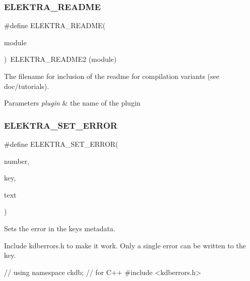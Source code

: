\subsubsection{\texorpdfstring{E\+L\+E\+K\+T\+R\+A\+\_\+\+R\+E\+A\+D\+ME}{ELEKTRA\_README}}
{\footnotesize\ttfamily \#define E\+L\+E\+K\+T\+R\+A\+\_\+\+R\+E\+A\+D\+ME(\begin{DoxyParamCaption}\item[{}]{module }\end{DoxyParamCaption})~E\+L\+E\+K\+T\+R\+A\+\_\+\+R\+E\+A\+D\+M\+E2 (module)}



The filename for inclusion of the readme for compilation variants (see doc/tutorials). 


\begin{DoxyParams}{Parameters}
{\em plugin} & the name of the plugin \\
\hline
\end{DoxyParams}
\mbox{\label{group__plugin_gaab1842b82272e6d4235b6a71587a64d9}} 
\subsubsection{\texorpdfstring{E\+L\+E\+K\+T\+R\+A\+\_\+\+S\+E\+T\+\_\+\+E\+R\+R\+OR}{ELEKTRA\_SET\_ERROR}}
{\footnotesize\ttfamily \#define E\+L\+E\+K\+T\+R\+A\+\_\+\+S\+E\+T\+\_\+\+E\+R\+R\+OR(\begin{DoxyParamCaption}\item[{}]{number,  }\item[{}]{key,  }\item[{}]{text }\end{DoxyParamCaption})}



Sets the error in the keys metadata. 

Include kdberrors.\+h to make it work. Only a single error can be written to the key.


\begin{DoxyCodeInclude}
\textcolor{comment}{// using namespace ckdb; // for C++}
\textcolor{preprocessor}{#include <kdberrors.h>}
\end{DoxyCodeInclude}



